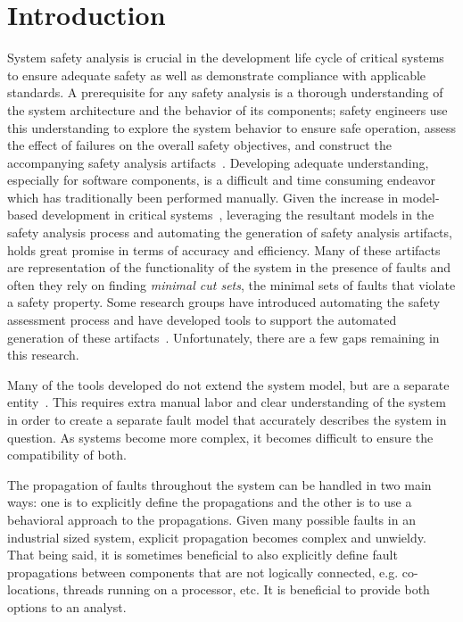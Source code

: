 \chapter{Introduction}
\label{chap:intro}

System safety analysis is crucial in the development life cycle of critical systems to ensure adequate safety as well as demonstrate compliance with applicable standards. A prerequisite for any safety analysis is a thorough understanding of the system architecture and the behavior of its components; safety engineers use this understanding to explore the system behavior to ensure safe operation, assess the effect of failures on the overall safety objectives, and construct the accompanying safety analysis artifacts~\cite{SAE:ARP4761,SAE:ARP4754A}. Developing adequate understanding, especially for software components, is a difficult and time consuming endeavor which has traditionally been performed manually. Given the increase in model-based development in critical systems~\cite{Joshi05:Dasc,CAV2015:BoCiGrMa,info17:HaLuHo,5979344,Gudemann:2010:FQQ:1909626.1909813}, leveraging the resultant models in the safety analysis process and automating the generation of safety analysis artifacts, holds great promise in terms of accuracy and efficiency. Many of these artifacts are representation of the functionality of the system in the presence of faults and often they rely on finding \textit{minimal cut sets}, the minimal sets of faults that violate a safety property. Some research groups have introduced automating the safety assessment process and have developed tools to support the automated generation of these artifacts~\cite{Joshi05:SafeComp,CAV2015:BoCiGrMa,10.1007/978-3-319-11936-6-7}. Unfortunately, there are a few gaps remaining in this research. 

Many of the tools developed do not extend the system model, but are a separate entity~\cite{symbAltaRica, DBLP:conf/tacas/BittnerBCCGGMMZ16, info8010007, Gudemann:2010:FQQ:1909626.1909813}. This requires extra manual labor and clear understanding of the system in order to create a separate fault model that accurately describes the system in question. As systems become more complex, it becomes difficult to ensure the compatibility of both. %

The propagation of faults throughout the system can be handled in two main ways: one is to explicitly define the propagations and the other is to use a behavioral approach to the propagations. Given many possible faults in an industrial sized system, explicit propagation becomes complex and unwieldy. That being said, it is sometimes beneficial to also explicitly define fault propagations between components that are not logically connected, e.g. co-locations, threads running on a processor, etc. It is beneficial to provide both options to an analyst. 

